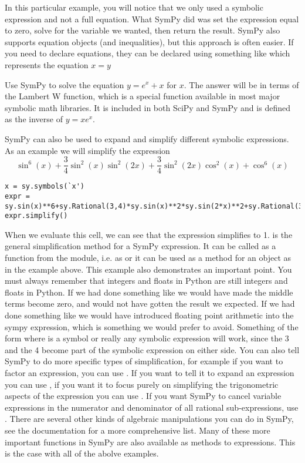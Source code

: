 In this particular example, you will notice that we only used a symbolic expression and not a full equation.
What SymPy did was set the expression equal to zero, solve for the variable we wanted, then return the result.
SymPy also supports equation objects (and inequalities), but this approach is often easier.
If you need to declare equations, they can be declared using something like  which represents the equation $x=y$

\begin{problem}
Use SymPy to solve the equation $y=e^x+x$ for $x$.
The answer will be in terms of the Lambert W function, which is a special function available in most major symbolic math libraries.
It is included in both SciPy and SymPy and is defined as the inverse of $y=x e^x$.
\end{problem}

SymPy can also be used to expand and simplify different symbolic expressions.
As an example we will simplify the expression
\begin{equation*}
\sin^6(x)+\frac{3}{4}\sin^2(x)\sin^2(2x)+\frac{3}{4}\sin^2(2x)\cos^2(x)+\cos^6(x)
\end{equation*}
\begin{lstlisting}
x = sy.symbols(`x')
expr = sy.sin(x)**6+sy.Rational(3,4)*sy.sin(x)**2*sy.sin(2*x)**2+sy.Rational(3,4)*sy.sin(2*x)**2*sy.cos(x)**2+sy.cos(x)**6
expr.simplify()
\end{lstlisting}
When we evaluate this cell, we can see that the expression simplifies to 1.
 is the general simplification method for a SymPy expression.
It can be called as a function from the module, i.e. as  or it can be used as a method for an object as in the example above.
This example also demonstrates an important point.
You must always remember that integers and floats in Python are still integers and floats in Python.
If we had done something like  we would have made the middle terms become zero, and would not have gotten the result we expected.
If we had done something like  we would have introduced floating point arithmetic into the sympy expression, which is something we would prefer to avoid.
Something of the form  where  is a symbol or really any symbolic expression will work, since the 3 and the 4 become part of the symbolic expression on either side.
You can also tell SymPy to do more specific types of simplification, for example if you want to factor an expression, you can use .
If you want to tell it to expand an expression you can use , if you want it to focus purely on simplifying the trigonometric aspects of the expression you can use .
If you want SymPy to cancel variable expressions in the numerator and denominator of all rational sub-expressions, use .
There are several other kinds of algebraic manipulations you can do in SymPy, see the documentation for a more comprehensive list.
Many of these more important functions in SymPy are also available as methods to expressions.
This is the case with all of the abolve examples.

